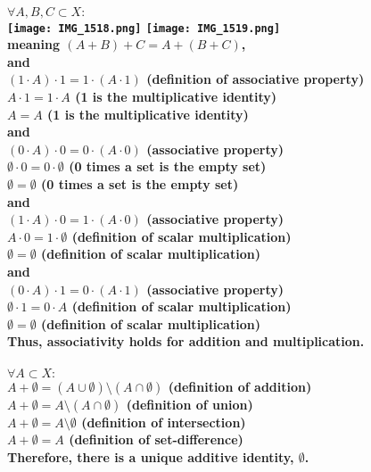 \documentclass{article}
\begin{document}
\paragraph{\large
\(\forall A, B, C \subset X:\)
\\\texttt{[image: IMG\_1518.png]}
\texttt{[image: IMG\_1519.png]}
\\\indent meaning \((A + B) + C = A + (B + C)\),
\\and
\\\indent \((1 \cdot A) \cdot 1 = 1 \cdot (A \cdot 1)\) (definition of associative property)
\\\indent \(A \cdot 1 = 1 \cdot A\) (1 is the multiplicative identity)
\\\indent \(A = A\) (1 is the multiplicative identity)
\\and
\\\indent \((0 \cdot A) \cdot 0 = 0 \cdot (A \cdot 0)\) (associative property)
\\\indent \(\emptyset \cdot 0 = 0 \cdot \emptyset\) (0 times a set is the empty set)
\\\indent \(\emptyset = \emptyset\) (0 times a set is the empty set)
\\and
\\\indent \((1 \cdot A) \cdot 0 = 1 \cdot (A \cdot 0)\) (associative property)
\\\indent \(A \cdot 0 = 1 \cdot \emptyset\) (definition of scalar multiplication)
\\\indent \(\emptyset = \emptyset\) (definition of scalar multiplication)
\\and
\\\indent \((0 \cdot A) \cdot 1 = 0 \cdot (A \cdot 1)\) (associative property)
\\\indent \(\emptyset \cdot 1 = 0 \cdot A\) (definition of scalar multiplication)
\\\indent \(\emptyset = \emptyset\) (definition of scalar multiplication)
\\Thus, associativity holds for addition and multiplication.}

\paragraph{\large
\(\forall A \subset X:\)
\\\indent \(A + \emptyset = (A \cup \emptyset) \setminus (A \cap \emptyset)\) (definition of addition)
\\\indent \(A + \emptyset = A \setminus (A \cap \emptyset)\) (definition of union)
\\\indent \(A + \emptyset = A \setminus \emptyset\) (definition of intersection)
\\\indent \(A + \emptyset = A\) (definition of set-difference)
\\Therefore, there is a unique additive identity, \(\emptyset\).}
\end{document}
